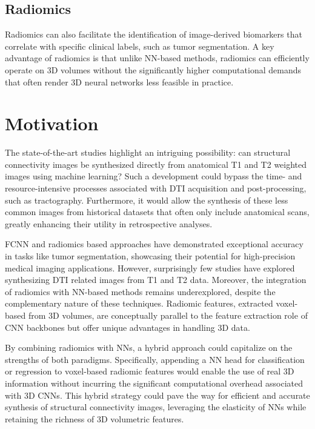 \subsection{Radiomics}

Radiomics can also facilitate the identification of image-derived biomarkers that correlate with specific clinical labels, such as tumor segmentation. \cite{radioseg} \cite{radioseg2} \cite{radioseg3} A key advantage of radiomics is that unlike \ac{NN}-based methods, radiomics can efficiently operate on 3D volumes without the significantly higher computational demands that often render 3D neural networks less feasible in practice.\par

\section{Motivation}

The state-of-the-art studies highlight an intriguing possibility: can structural connectivity images be synthesized directly from anatomical T1 and T2 weighted images using machine learning? Such a development could bypass the time- and resource-intensive processes associated with \ac{DTI} acquisition and post-processing, such as tractography. Furthermore, it would allow the synthesis of these less common images from historical datasets that often only include anatomical scans, greatly enhancing their utility in retrospective analyses.\par
\ac{FCNN} and radiomics based approaches have demonstrated exceptional accuracy in tasks like tumor segmentation, showcasing their potential for high-precision medical imaging applications. However, surprisingly few studies have explored synthesizing \ac{DTI} related images from T1 and T2 data. Moreover, the integration of radiomics with \ac{NN}-based methods remains underexplored, despite the complementary nature of these techniques. Radiomic features, extracted voxel-based from 3D volumes, are conceptually parallel to the feature extraction role of \ac{CNN} backbones but offer unique advantages in handling 3D data.\par
By combining radiomics with \ac{NN}s, a hybrid approach could capitalize on the strengths of both paradigms. Specifically, appending a \ac{NN} head for classification or regression to voxel-based radiomic features would enable the use of real 3D information without incurring the significant computational overhead associated with 3D \ac{CNN}s. This hybrid strategy could pave the way for efficient and accurate synthesis of structural connectivity images, leveraging the elasticity of \ac{NN}s while retaining the richness of 3D volumetric features.


